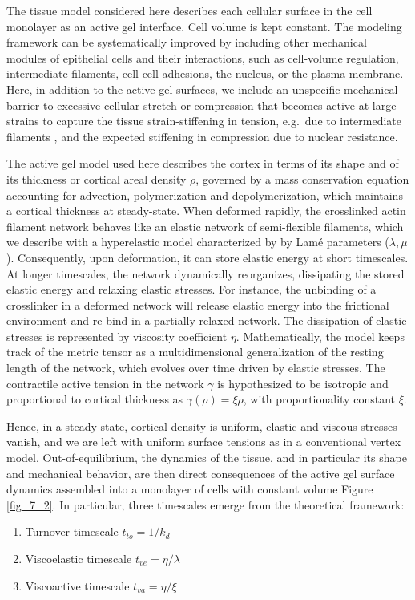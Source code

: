 The tissue model considered here describes each cellular surface in the cell monolayer as an active gel interface. Cell volume is kept constant. The modeling framework can be systematically improved by including other mechanical modules of epithelial cells and their interactions, such as cell-volume regulation, intermediate filaments, cell-cell adhesions, the nucleus, or the plasma membrane. Here, in addition to the active gel surfaces, we include an unspecific mechanical barrier to excessive cellular stretch or compression that becomes active at large strains to capture the tissue strain-stiffening in tension, e.g.~due to intermediate filaments \cite{latorre2018,duque2023}, and the expected stiffening in compression due to nuclear resistance.

The active gel model used here describes the cortex in terms of its shape and of its thickness or cortical areal density \(\rho\), governed by a mass conservation equation accounting for advection, polymerization and depolymerization, which maintains a cortical thickness at steady-state. When deformed rapidly, the crosslinked actin filament network behaves like an elastic network of semi-flexible filaments, which we describe with a hyperelastic model characterized by by Lamé parameters  (\(\lambda,\mu\)). Consequently, upon deformation, it can store elastic energy at short timescales. At longer timescales, the network dynamically reorganizes, dissipating the stored elastic energy and relaxing elastic stresses. For instance, the unbinding of a crosslinker in a deformed network will release elastic energy into the frictional environment and re-bind in a partially relaxed network. The dissipation of elastic stresses is represented by viscosity coefficient \(\eta\). Mathematically, the model keeps track of the metric tensor as a multidimensional generalization of the resting length of the network, which evolves over time driven by elastic stresses. The contractile active tension in the network \(\gamma\) is hypothesized to be isotropic and  proportional to cortical thickness as $\gamma(\rho) = \xi \rho$, with proportionality constant  \(\xi\). 

Hence, in a steady-state, cortical density is uniform, elastic and viscous stresses vanish, and we are left with uniform surface tensions as in a conventional vertex model. Out-of-equilibrium, the dynamics of the tissue, and in particular its shape and mechanical behavior, are then direct consequences of the active gel surface dynamics assembled into a monolayer of cells with constant volume Figure \ref{fig_7_2}. In particular, three timescales emerge from the theoretical framework: 
\begin{enumerate}
	\item Turnover timescale \(t_{to} = 1/k_{d}\)
	\item Viscoelastic timescale \(t_{ve} = \eta/\lambda\)
	\item Viscoactive timescale \(t_{va} = \eta/\xi\)
\end{enumerate}

